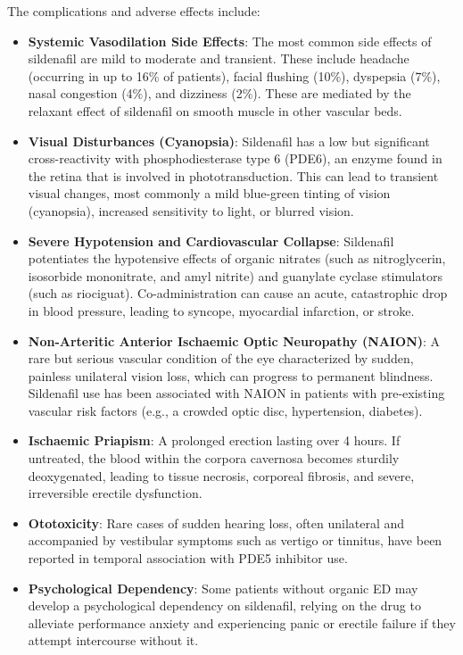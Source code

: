 The complications and adverse effects include:
\begin{itemize}
    \item \textbf{Systemic Vasodilation Side Effects}: The most common side effects of sildenafil are mild to moderate and transient. These include headache (occurring in up to 16\% of patients), facial flushing (10\%), dyspepsia (7\%), nasal congestion (4\%), and dizziness (2\%). These are mediated by the relaxant effect of sildenafil on smooth muscle in other vascular beds.
    \item \textbf{Visual Disturbances (Cyanopsia)}: Sildenafil has a low but significant cross-reactivity with phosphodiesterase type 6 (PDE6), an enzyme found in the retina that is involved in phototransduction. This can lead to transient visual changes, most commonly a mild blue-green tinting of vision (cyanopsia), increased sensitivity to light, or blurred vision.
    \item \textbf{Severe Hypotension and Cardiovascular Collapse}: Sildenafil potentiates the hypotensive effects of organic nitrates (such as nitroglycerin, isosorbide mononitrate, and amyl nitrite) and guanylate cyclase stimulators (such as riociguat). Co-administration can cause an acute, catastrophic drop in blood pressure, leading to syncope, myocardial infarction, or stroke.
    \item \textbf{Non-Arteritic Anterior Ischaemic Optic Neuropathy (NAION)}: A rare but serious vascular condition of the eye characterized by sudden, painless unilateral vision loss, which can progress to permanent blindness. Sildenafil use has been associated with NAION in patients with pre-existing vascular risk factors (e.g., a crowded optic disc, hypertension, diabetes).
    \item \textbf{Ischaemic Priapism}: A prolonged erection lasting over 4 hours. If untreated, the blood within the corpora cavernosa becomes sturdily deoxygenated, leading to tissue necrosis, corporeal fibrosis, and severe, irreversible erectile dysfunction.
    \item \textbf{Ototoxicity}: Rare cases of sudden hearing loss, often unilateral and accompanied by vestibular symptoms such as vertigo or tinnitus, have been reported in temporal association with PDE5 inhibitor use.
    \item \textbf{Psychological Dependency}: Some patients without organic ED may develop a psychological dependency on sildenafil, relying on the drug to alleviate performance anxiety and experiencing panic or erectile failure if they attempt intercourse without it.
\end{itemize}

